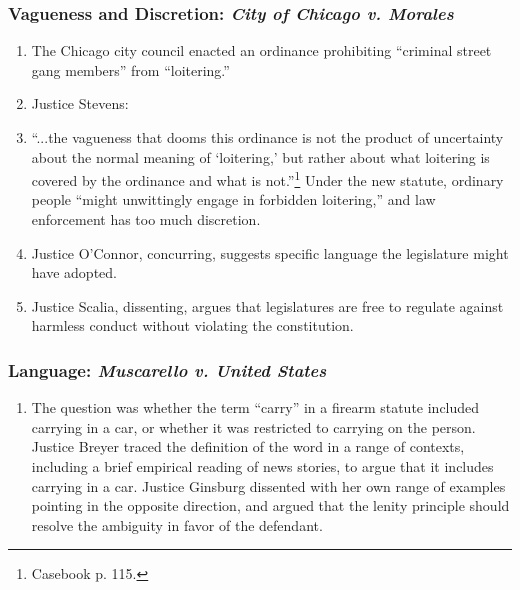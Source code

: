 \subsubsection{Vagueness and Discretion: \emph{City of Chicago v. Morales}}

\begin{enumerate}
    \item The Chicago city council enacted an ordinance prohibiting ``criminal street gang members'' from ``loitering.''
    \item Justice Stevens:
    \item ``...the vagueness that dooms this ordinance is not the product of uncertainty about the normal meaning of `loitering,' but rather about what loitering is covered by the ordinance and what is not.''\footnote{Casebook p. 115.} Under the new statute, ordinary people ``might unwittingly engage in forbidden loitering,'' and law enforcement has too much discretion.
    \item Justice O'Connor, concurring, suggests specific language the legislature might have adopted.
    \item Justice Scalia, dissenting, argues that legislatures are free to regulate against harmless conduct without violating the constitution.
\end{enumerate}

\subsubsection{Language: \emph{Muscarello v. United States}}

\begin{enumerate}
    \item The question was whether the term ``carry'' in a firearm statute included carrying in a car, or whether it was restricted to carrying on the person. Justice Breyer traced the definition of the word in a range of contexts, including a brief empirical reading of news stories, to argue that it includes carrying in a car. Justice Ginsburg dissented with her own range of examples pointing in the opposite direction, and argued that the lenity principle should resolve the ambiguity in favor of the defendant.
\end{enumerate}

